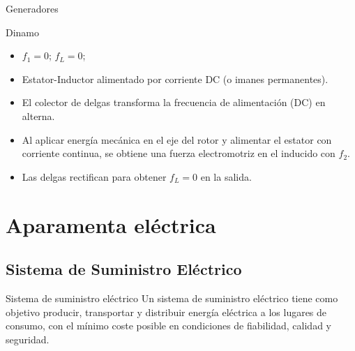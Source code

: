 \documentclass[xcolor={usenames,svgnames,dvipsnames}]{beamer}
\begin{document}
\begin{frame}[label={sec:org13fcbb6}]{Generadores}
\begin{block}{Dinamo}
\begin{itemize}
\item \(f_{1}=0\); \(f_{L}=0\);

\item Estator-Inductor alimentado por corriente DC (o imanes permanentes).

\item El colector de delgas transforma la frecuencia de alimentación (DC)
en alterna.

\item Al aplicar energía mecánica en el eje del rotor y alimentar el
estator con corriente continua, se obtiene una fuerza electromotriz
en el inducido con \(f_{2}\).

\item Las delgas rectifican para obtener \(f_{L}=0\) en la salida.
\end{itemize}
\end{block}
\end{frame}

\section{Aparamenta eléctrica}
\label{sec:orgb5da13c}

\subsection{Sistema de Suministro Eléctrico}
\label{sec:orgbbf1274}
\begin{frame}[label={sec:org7d97b31}]{Sistema de suministro eléctrico}
Un \alert{sistema de suministro eléctrico} tiene como objetivo \alert{producir,
transportar y distribuir energía eléctrica} a los lugares de consumo,
con el mínimo coste posible en condiciones de \alert{fiabilidad, calidad y
seguridad}.
\end{frame}
\end{document}
